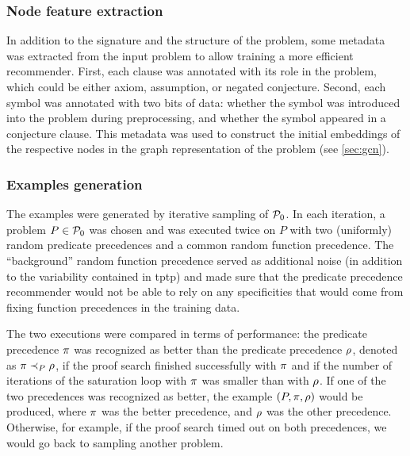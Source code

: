 \subsubsection{Node feature extraction}

In addition to the signature and the structure of the problem,
some metadata was extracted from the input problem to allow training a more efficient recommender.
First, each clause was annotated with its role in the problem,
which could be either axiom, assumption, or negated conjecture.
Second, each symbol was annotated with two bits of data:
whether the symbol was introduced into the problem during preprocessing,
and whether the symbol appeared in a conjecture clause.
This metadata was used to construct the initial embeddings of the respective nodes
in the graph representation of the problem (see \cref{sec:gcn}).

\subsubsection{Examples generation}

The examples were generated by iterative sampling of $\operatorname{\mathcal{P}_{0}}$.
In each iteration, a problem $P \in \operatorname{\mathcal{P}_{0}}$ was chosen and \Vampire{} was executed twice on $P$
with two (uniformly) random predicate precedences and a common random function precedence.
The ``background'' random function precedence served as additional noise (in addition to the variability 
contained in \acrshort{tptp}) and made sure that the predicate precedence recommender
would not be able to rely on any specificities that would come from fixing function precedences in the training data.

The two executions were compared in terms of performance:
the predicate precedence $\pi$ was recognized as better than the predicate precedence $\rho$,
denoted as $\pi \prec_{P} \rho$,
if the proof search finished successfully with $\pi$
and if the number of iterations of the saturation loop with $\pi$ was smaller than with $\rho$.
If one of the two precedences was recognized as better,
the example $(P, \pi, \rho)$ would be produced,
where $\pi$ was the better precedence,
and $\rho$ was the other precedence.
Otherwise, for example, if the proof search timed out on both precedences, we would go back to sampling another problem.

